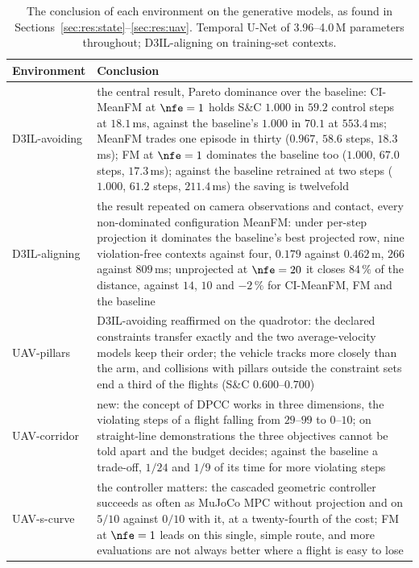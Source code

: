 \begin{table}[htpb]
  \caption[Generative models across environments]{The conclusion of each environment on the generative models,
  as found in Sections~\ref{sec:res:state}--\ref{sec:res:uav}. Temporal U-Net of 3.96--4.0\,M parameters
  throughout; D3IL-aligning on training-set contexts.}
  \label{tab:summary-models}
  \centering
  \small
  \begin{tabularx}{\linewidth}{@{}p{2.2cm} L@{}}
    \toprule
    Environment & Conclusion \\
    \midrule
    D3IL-avoiding & the central result, Pareto dominance over the baseline: CI-MeanFM at $\nfe=1$ holds S\&C
                    $1.000$ in $59.2$ control steps at $18.1$\,ms, against the baseline's $1.000$ in $70.1$ at
                    $553.4$\,ms; MeanFM trades one episode in thirty ($0.967$, $58.6$ steps, $18.3$\,ms); FM at
                    $\nfe=1$ dominates the baseline too ($1.000$, $67.0$ steps, $17.3$\,ms); against the baseline
                    retrained at two steps ($1.000$, $61.2$ steps, $211.4$\,ms) the saving is twelvefold \\
    D3IL-aligning & the result repeated on camera observations and contact, every non-dominated configuration
                    MeanFM: under per-step projection it
                    dominates the baseline's best projected row, nine violation-free contexts against four,
                    $0.179$ against $0.462$\,m, $266$ against $809$\,ms; unprojected at $\nfe=20$ it closes
                    $84\,\%$ of the distance, against $14$, $10$ and $-2\,\%$ for CI-MeanFM, FM and the baseline \\
    UAV-pillars   & D3IL-avoiding reaffirmed on the quadrotor: the declared constraints transfer exactly and the
                    two average-velocity models keep their order; the vehicle tracks more closely than the arm,
                    and collisions with pillars outside the constraint sets end a third of the flights (S\&C
                    $0.600$--$0.700$) \\
    UAV-corridor  & new: the concept of \ac{DPCC} works in three dimensions, the violating steps of a flight
                    falling from $29$--$99$ to $0$--$10$; on straight-line demonstrations the three objectives
                    cannot be told apart and the budget decides; against the baseline a trade-off, $1/24$ and
                    $1/9$ of its time for more violating steps \\
    UAV-s-curve   & the controller matters: the cascaded geometric controller succeeds as often as MuJoCo MPC
                    without projection and on $5/10$ against $0/10$ with it, at a twenty-fourth of the cost; FM
                    at $\nfe=1$ leads on this single, simple route, and more evaluations are not always better
                    where a flight is easy to lose \\
    \bottomrule
  \end{tabularx}
\end{table}

